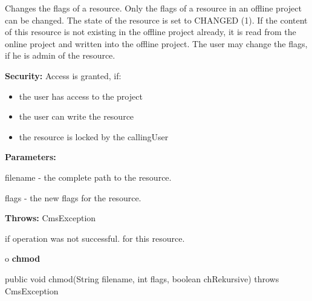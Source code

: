 \begin{description}
\htmlDD Changes the flags of a resource. \htmlBR
Only the flags of a resource in an offline project can be changed. The state
of the resource is set to CHANGED (1). If the content of this resource is not
existing in the offline project already, it is read from the online project
and written into the offline project. The user may change the flags, if he is
admin of the resource.

{\bf Security:} Access is granted, if:

\begin{itemize}
\item the user has access to the project
\item the user can write the resource
\item the resource is locked by the callingUser
\end{itemize}

\begin{description}
\item {\bf Parameters:}

filename - the complete path to the resource.

flags - the new flags for the resource.
\item {\bf Throws:} CmsException

if operation was not successful. for this resource.
\end{description}

\end{description}

o {\bf chmod}

\begin{PRE}
 public void chmod(String filename,
                   int flags,
                   boolean chRekursive) throws CmsException
\end{PRE}


